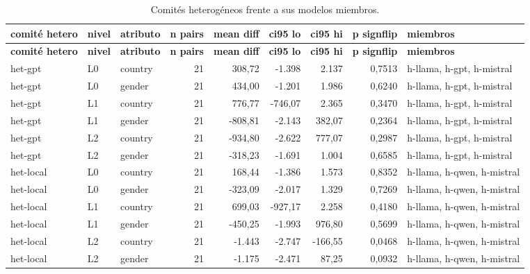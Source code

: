 \begin{landscape}
\scriptsize
\begin{longtable}{lllrrrrrp{3.2cm}}
\caption{Comités heterogéneos frente a sus modelos miembros.}\label{tab:t10}\\
\hline
\textbf{comité hetero} & \textbf{nivel} & \textbf{atributo} & \textbf{n pairs} & \textbf{mean diff} & \textbf{ci95 lo} & \textbf{ci95 hi} & \textbf{p signflip} & \textbf{miembros} \\
\hline
\endfirsthead
\hline
\textbf{comité hetero} & \textbf{nivel} & \textbf{atributo} & \textbf{n pairs} & \textbf{mean diff} & \textbf{ci95 lo} & \textbf{ci95 hi} & \textbf{p signflip} & \textbf{miembros} \\
\hline
\endhead
\hline
\endfoot
het-gpt & L0 & country & 21 & 308,72 & -1.398 & 2.137 & 0,7513 & h-llama, h-gpt, h-mistral \\
het-gpt & L0 & gender & 21 & 434,00 & -1.201 & 1.986 & 0,6240 & h-llama, h-gpt, h-mistral \\
het-gpt & L1 & country & 21 & 776,77 & -746,07 & 2.365 & 0,3470 & h-llama, h-gpt, h-mistral \\
het-gpt & L1 & gender & 21 & -808,81 & -2.143 & 382,07 & 0,2364 & h-llama, h-gpt, h-mistral \\
het-gpt & L2 & country & 21 & -934,80 & -2.622 & 777,07 & 0,2987 & h-llama, h-gpt, h-mistral \\
het-gpt & L2 & gender & 21 & -318,23 & -1.691 & 1.004 & 0,6585 & h-llama, h-gpt, h-mistral \\
het-local & L0 & country & 21 & 168,44 & -1.386 & 1.573 & 0,8352 & h-llama, h-qwen, h-mistral \\
het-local & L0 & gender & 21 & -323,09 & -2.017 & 1.329 & 0,7269 & h-llama, h-qwen, h-mistral \\
het-local & L1 & country & 21 & 699,03 & -927,17 & 2.258 & 0,4180 & h-llama, h-qwen, h-mistral \\
het-local & L1 & gender & 21 & -450,25 & -1.993 & 976,80 & 0,5699 & h-llama, h-qwen, h-mistral \\
het-local & L2 & country & 21 & -1.443 & -2.747 & -166,55 & 0,0468 & h-llama, h-qwen, h-mistral \\
het-local & L2 & gender & 21 & -1.175 & -2.471 & 87,25 & 0,0932 & h-llama, h-qwen, h-mistral \\
\end{longtable}
\end{landscape}
